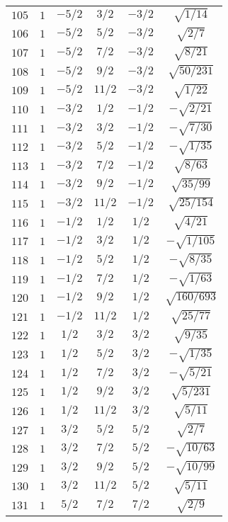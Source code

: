 \begin{table}
\begin{center}
\begin{tabular}{|c|c|c|c|c|c|}
$105$ & $1$ & $-5/2$ & $3/2$ & $-3/2$ & $\sqrt{1/14}$ \\ 
$106$ & $1$ & $-5/2$ & $5/2$ & $-3/2$ & $\sqrt{2/7}$ \\ 
$107$ & $1$ & $-5/2$ & $7/2$ & $-3/2$ & $\sqrt{8/21}$ \\ 
$108$ & $1$ & $-5/2$ & $9/2$ & $-3/2$ & $\sqrt{50/231}$ \\ 
$109$ & $1$ & $-5/2$ & $11/2$ & $-3/2$ & $\sqrt{1/22}$ \\ 
$110$ & $1$ & $-3/2$ & $1/2$ & $-1/2$ & $-\sqrt{2/21}$ \\ 
$111$ & $1$ & $-3/2$ & $3/2$ & $-1/2$ & $-\sqrt{7/30}$ \\ 
$112$ & $1$ & $-3/2$ & $5/2$ & $-1/2$ & $-\sqrt{1/35}$ \\ 
$113$ & $1$ & $-3/2$ & $7/2$ & $-1/2$ & $\sqrt{8/63}$ \\ 
$114$ & $1$ & $-3/2$ & $9/2$ & $-1/2$ & $\sqrt{35/99}$ \\ 
$115$ & $1$ & $-3/2$ & $11/2$ & $-1/2$ & $\sqrt{25/154}$ \\ 
$116$ & $1$ & $-1/2$ & $1/2$ & $1/2$ & $\sqrt{4/21}$ \\ 
$117$ & $1$ & $-1/2$ & $3/2$ & $1/2$ & $-\sqrt{1/105}$ \\ 
$118$ & $1$ & $-1/2$ & $5/2$ & $1/2$ & $-\sqrt{8/35}$ \\ 
$119$ & $1$ & $-1/2$ & $7/2$ & $1/2$ & $-\sqrt{1/63}$ \\ 
$120$ & $1$ & $-1/2$ & $9/2$ & $1/2$ & $\sqrt{160/693}$ \\ 
$121$ & $1$ & $-1/2$ & $11/2$ & $1/2$ & $\sqrt{25/77}$ \\ 
$122$ & $1$ & $1/2$ & $3/2$ & $3/2$ & $\sqrt{9/35}$ \\ 
$123$ & $1$ & $1/2$ & $5/2$ & $3/2$ & $-\sqrt{1/35}$ \\ 
$124$ & $1$ & $1/2$ & $7/2$ & $3/2$ & $-\sqrt{5/21}$ \\ 
$125$ & $1$ & $1/2$ & $9/2$ & $3/2$ & $\sqrt{5/231}$ \\ 
$126$ & $1$ & $1/2$ & $11/2$ & $3/2$ & $\sqrt{5/11}$ \\ 
$127$ & $1$ & $3/2$ & $5/2$ & $5/2$ & $\sqrt{2/7}$ \\ 
$128$ & $1$ & $3/2$ & $7/2$ & $5/2$ & $-\sqrt{10/63}$ \\ 
$129$ & $1$ & $3/2$ & $9/2$ & $5/2$ & $-\sqrt{10/99}$ \\ 
$130$ & $1$ & $3/2$ & $11/2$ & $5/2$ & $\sqrt{5/11}$ \\ 
$131$ & $1$ & $5/2$ & $7/2$ & $7/2$ & $\sqrt{2/9}$ \\ 

\end{tabular}
\end{center}
\end{table}
